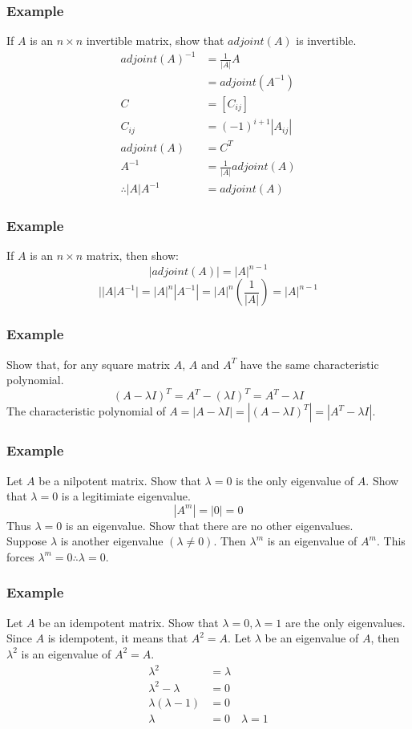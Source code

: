 \documentclass{math}
\begin{document}
\subsubsection*{Example}
If \( A \) is an \( n\times n \) invertible matrix, show that \( adjoint(A) \)
is invertible.
\begin{align*}
  adjoint(A)^{-1} &= \frac{1}{|A|}A \\
  &= adjoint(A^{-1}) \\
  C &= [C_{ij}] \\
  C_{ij} &= (-1)^{i+1}|A_{ij}| \\
  adjoint(A) &= C^T \\
  A^{-1} &= \frac{1}{|A|}adjoint(A) \\
  \therefore |A|A^{-1} &= adjoint(A)
\end{align*}

\subsubsection*{Example}
If \( A \) is an \( n\times n \) matrix, then show:
\[ |adjoint(A)| = |A|^{n-1} \]
\[ \bigg||A|A^{-1}\bigg| = |A|^n|A^{-1}| = |A|^n(\frac{1}{|A|}) = |A|^{n-1} \]

\subsubsection*{Example}
Show that, for any square matrix \( A \), \( A \) and \( A^T \) have the same
characteristic polynomial.
\[ (A-\lambda I)^T = A^T-(\lambda I)^T = A^T-\lambda I \]
The characteristic polynomial of \( A = |A-\lambda I| = |(A-\lambda I)^T| =
|A^T-\lambda I| \).

\subsubsection*{Example}
Let \( A \) be a nilpotent matrix. Show that \( \lambda = 0 \) is the only
eigenvalue of \( A \). Show that \( \lambda = 0 \) is a legitimiate eigenvalue.
\[ |A^m| = |0| = 0 \]
Thus \( \lambda = 0 \) is an eigenvalue. Show that there are no other
eigenvalues. \\
Suppose \( \lambda \) is another eigenvalue \( (\lambda\ne0) \).
Then \( \lambda^m \) is an eigenvalue of \( A^m \). This forces \( \lambda^m =
0 \therefore \lambda = 0 \).

\subsubsection*{Example}
Let \( A \) be an idempotent matrix. Show that \( \lambda = 0,\lambda = 1 \) are
the only eigenvalues. \\
Since \( A \) is idempotent, it means that \( A^2 = A \). Let \( \lambda \) be
an eigenvalue of \( A \), then \( \lambda^2 \) is an eigenvalue of
\( A^2 = A \).
\begin{align*}
  \lambda^2 &= \lambda \\
  \lambda^2-\lambda &= 0 \\
  \lambda(\lambda-1) &= 0 \\
  \lambda &= 0 \quad \lambda = 1
\end{align*}
\end{document}
